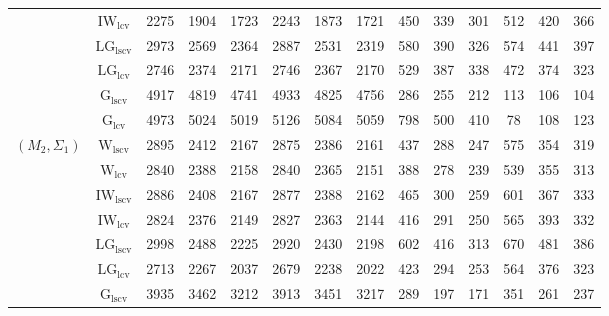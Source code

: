 \begin{table}[!ht]
{\begin{tabular}{@{}cc|ccc|ccc|ccc|ccc@{}}
 & $\mathrm{IW}_{\mathrm{lcv}}$ & \cellcolor{black!30}2275 & \cellcolor{black!30}1904 & \cellcolor{black!30}1723 & \cellcolor{black!30}2243 & \cellcolor{black!30}1873 & \cellcolor{black!30}1721 & 450 & 339 & 301 & 512 & 420 & 366 \\ 
 & $\mathrm{LG}_{\mathrm{lscv}}$ & 2973 & 2569 & 2364 & 2887 & 2531 & 2319 & 580 & 390 & 326 & 574 & 441 & 397 \\ 
 & $\mathrm{LG}_{\mathrm{lcv}}$ & 2746 & 2374 & 2171 & 2746 & 2367 & 2170 & 529 & 387 & 338 & 472 & 374 & 323 \\ 
 & $\mathrm{G}_{\mathrm{lscv}}$ & 4917 & 4819 & 4741 & 4933 & 4825 & 4756 & \cellcolor{black!30}286 & \cellcolor{black!30}255 & \cellcolor{black!30}212 & \cellcolor{black!10}113 & \cellcolor{black!30}106 & \cellcolor{black!30}104 \\ 
 & $\mathrm{G}_{\mathrm{lcv}}$ & 4973 & 5024 & 5019 & 5126 & 5084 & 5059 & 798 & 500 & 410 & \cellcolor{black!30}78 & \cellcolor{black!10}108 & \cellcolor{black!10}123 \\ 
\midrule
$(M_2,\Sigma_1)$ & $\mathrm{W}_{\mathrm{lscv}}$ & 2895 & 2412 & 2167 & 2875 & 2386 & 2161 & 437 & 288 & 247 & 575 & \cellcolor{black!10}354 & 319 \\ 
 & $\mathrm{W}_{\mathrm{lcv}}$ & 2840 & 2388 & 2158 & 2840 & 2365 & 2151 & \cellcolor{black!10}388 & \cellcolor{black!10}278 & \cellcolor{black!10}239 & 539 & 355 & \cellcolor{black!10}313 \\ 
 & $\mathrm{IW}_{\mathrm{lscv}}$ & 2886 & 2408 & 2167 & 2877 & 2388 & 2162 & 465 & 300 & 259 & 601 & 367 & 333 \\ 
 & $\mathrm{IW}_{\mathrm{lcv}}$ & \cellcolor{black!10}2824 & \cellcolor{black!10}2376 & \cellcolor{black!10}2149 & \cellcolor{black!10}2827 & \cellcolor{black!10}2363 & \cellcolor{black!10}2144 & 416 & 291 & 250 & 565 & 393 & 332 \\ 
 & $\mathrm{LG}_{\mathrm{lscv}}$ & 2998 & 2488 & 2225 & 2920 & 2430 & 2198 & 602 & 416 & 313 & 670 & 481 & 386 \\ 
 & $\mathrm{LG}_{\mathrm{lcv}}$ & \cellcolor{black!30}2713 & \cellcolor{black!30}2267 & \cellcolor{black!30}2037 & \cellcolor{black!30}2679 & \cellcolor{black!30}2238 & \cellcolor{black!30}2022 & 423 & 294 & 253 & 564 & 376 & 323 \\ 
 & $\mathrm{G}_{\mathrm{lscv}}$ & 3935 & 3462 & 3212 & 3913 & 3451 & 3217 & \cellcolor{black!30}289 & \cellcolor{black!30}197 & \cellcolor{black!30}171 & \cellcolor{black!30}351 & \cellcolor{black!30}261 & \cellcolor{black!30}237 \\ 

\end{tabular}}
\end{table}
